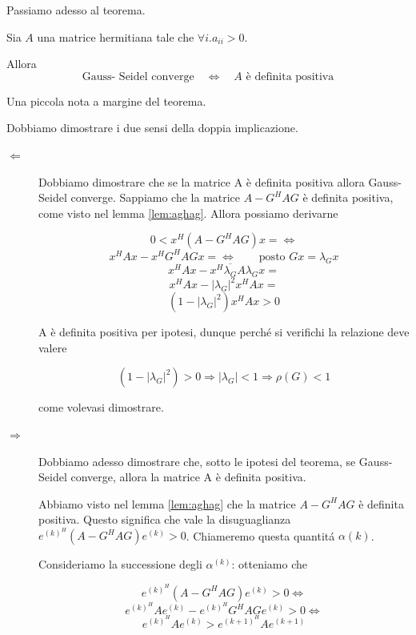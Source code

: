 Passiamo adesso al teorema.

\begin{theo}
Sia $A$ una matrice hermitiana tale che $\forall i.a_{ii} > 0 $.

Allora 
$$\text{Gauss- Seidel converge} \quad \Longleftrightarrow \quad  A \text{ \`e definita positiva}$$ 
\end{theo}
\begin{observation}
Una piccola nota a margine del teorema.


\end{observation}
\begin{thproof}
Dobbiamo dimostrare i due sensi della doppia implicazione.

\begin{description}
\item[$ \Leftarrow $] Dobbiamo dimostrare che se la matrice A \`e definita positiva allora Gauss-Seidel converge. Sappiamo che la matrice $ A - G^HAG $ \`e definita positiva, come visto nel lemma \ref{lem:aghag}. Allora possiamo derivarne

\[ 0 < x^{H}(A -G^{H} AG) x = \Leftrightarrow \]
\[ x^HAx - x^HG^HAGx = \Leftrightarrow \qquad \text{posto } Gx = \lambda_{G}x \]
\[ x^HAx - x^H \overline{\lambda_G} A \lambda_G x = \]
\[ x^HAx - | \lambda_G |^2 x^HAx = \]
\[ (1 - | \lambda_G |^2) x^HAx > 0 \]

A \`e definita positiva per ipotesi, dunque perch\'e si verifichi la relazione deve valere

\[ (1 - | \lambda_G |^2) > 0 \Rightarrow | \lambda_G | < 1 \Rightarrow \rho(G) < 1 \]

come volevasi dimostrare.

\item[$ \Rightarrow $] Dobbiamo adesso dimostrare che, sotto le ipotesi del teorema, se Gauss-Seidel converge, allora
la matrice A \`e definita positiva.

Abbiamo visto nel lemma \ref{lem:aghag} che la matrice $ A - G^HAG $ \`e definita positiva. Questo significa che vale la disuguaglianza $ e^{(k)^{H}} (A - G^HAG) e^{(k)} > 0 $. Chiameremo questa quantit\'a $ \alpha(k) $.

Consideriamo la successione degli $ \alpha^{(k)} $: otteniamo che

\[ e^{(k)^{H}} (A - G^HAG) e^{(k)} > 0 \Leftrightarrow \]
\[ e^{(k)^{H}} A e^{(k)} - e^{(k)^{H}} G^HAG e^{(k)} > 0 \Leftrightarrow \]
\[ e^{(k)^{H}} A e^{(k)} > e^{(k+1)^{H}} A e^{(k+1)} \]


\end{description}
\end{thproof}
